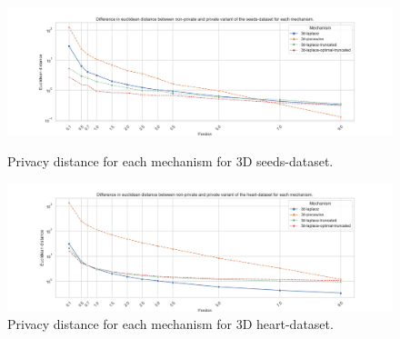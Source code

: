 \begin{figure}[H]
    \centering
    \begin{minipage}[c]{0.70\textwidth}
        \includegraphics[width=1\textwidth]{Results/RQ2/seeds-dataset/privacy_distance_plot.png}
        \caption{Privacy distance for each mechanism for 3D seeds-dataset.}
        \label{fig:privacy_seeds-dataset_comparison_3d_privacy_distance_plot}
    \end{minipage}
    \begin{minipage}[c]{0.70\textwidth}
        \includegraphics[width=1\textwidth]{Results/RQ2/heart-dataset/privacy_distance_plot.png}
        \caption{Privacy distance for each mechanism for 3D heart-dataset.}
        \label{fig:privacy_heart-dataset_comparison_3d_privacy_distance_plot}
    \end{minipage}
\end{figure}


\newpage
